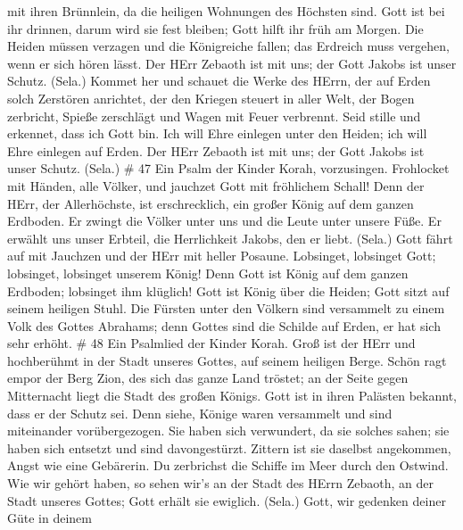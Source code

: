 mit ihren Brünnlein, da die heiligen Wohnungen des Höchsten sind.
 Gott ist bei ihr drinnen, darum wird sie fest bleiben; Gott
hilft ihr früh am Morgen.  Die Heiden müssen verzagen und
die Königreiche fallen; das Erdreich muss vergehen, wenn er sich hören
lässt.  Der HErr Zebaoth ist mit uns; der Gott Jakobs ist
unser Schutz. (Sela.)  Kommet her und schauet die Werke des
HErrn, der auf Erden solch Zerstören anrichtet,  der den
Kriegen steuert in aller Welt, der Bogen zerbricht, Spieße zerschlägt
und Wagen mit Feuer verbrennt.  Seid stille und erkennet,
dass ich Gott bin. Ich will Ehre einlegen unter den Heiden; ich will
Ehre einlegen auf Erden.  Der HErr Zebaoth ist mit uns; der
Gott Jakobs ist unser Schutz. (Sela.) \# 47  Ein Psalm der
Kinder Korah, vorzusingen.  Frohlocket mit Händen, alle
Völker, und jauchzet Gott mit fröhlichem Schall!  Denn der
HErr, der Allerhöchste, ist erschrecklich, ein großer König auf dem
ganzen Erdboden.  Er zwingt die Völker unter uns und die
Leute unter unsere Füße.  Er erwählt uns unser Erbteil, die
Herrlichkeit Jakobs, den er liebt. (Sela.)  Gott fährt auf
mit Jauchzen und der HErr mit heller Posaune.  Lobsinget,
lobsinget Gott; lobsinget, lobsinget unserem König!  Denn
Gott ist König auf dem ganzen Erdboden; lobsinget ihm klüglich!
 Gott ist König über die Heiden; Gott sitzt auf seinem
heiligen Stuhl.  Die Fürsten unter den Völkern sind
versammelt zu einem Volk des Gottes Abrahams; denn Gottes sind die
Schilde auf Erden, er hat sich sehr erhöht. \# 48  Ein
Psalmlied der Kinder Korah.  Groß ist der HErr und
hochberühmt in der Stadt unseres Gottes, auf seinem heiligen Berge.
 Schön ragt empor der Berg Zion, des sich das ganze Land
tröstet; an der Seite gegen Mitternacht liegt die Stadt des großen
Königs.  Gott ist in ihren Palästen bekannt, dass er der
Schutz sei.  Denn siehe, Könige waren versammelt und sind
miteinander vorübergezogen.  Sie haben sich verwundert, da
sie solches sahen; sie haben sich entsetzt und sind davongestürzt.
 Zittern ist sie daselbst angekommen, Angst wie eine
Gebärerin.  Du zerbrichst die Schiffe im Meer durch den
Ostwind.  Wie wir gehört haben, so sehen wir's an der Stadt
des HErrn Zebaoth, an der Stadt unseres Gottes; Gott erhält sie
ewiglich. (Sela.)  Gott, wir gedenken deiner Güte in deinem
